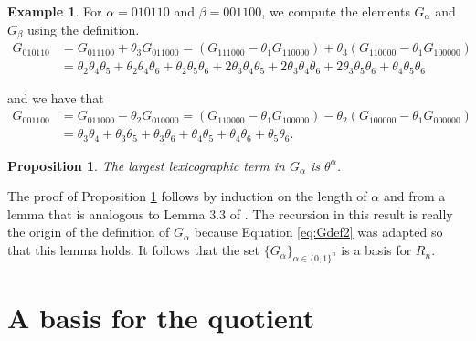 \documentclass[submission]{FPSAC2023}
\newtheorem{prop}[theorem]{Proposition}
\theoremstyle{definition}
\newtheorem{example}[theorem]{Example}
\numberwithin{equation}{section}
\begin{document}
\begin{example} For $\alpha = 010110$ and $\beta = 001100$, we compute
the elements $G_\alpha$ and $G_\beta$ using the definition.
\begin{align*}
G_{010110} &= G_{011100} + \theta_3 G_{011000} = (G_{111000} - \theta_1 G_{110000})
+ \theta_3(G_{110000} - \theta_1 G_{100000})\\
&= \theta_2 \theta_4 \theta_5 + \theta_2 \theta_4 \theta_6 + \theta_2 \theta_5 \theta_6
+ 2 \theta_3 \theta_4 \theta_5 + 2 \theta_3 \theta_4 \theta_6 + 2 \theta_3 \theta_5 \theta_6
+ \theta_4 \theta_5 \theta_6
\end{align*}

and we have that
\begin{align*}
G_{001100} &= G_{011000} - \theta_2 G_{010000} = (G_{110000} - \theta_1 G_{100000})
- \theta_2 (G_{100000} - \theta_1 G_{000000})\\
&= \theta_3 \theta_4 + \theta_3 \theta_5 + \theta_3 \theta_6 + \theta_4 \theta_5 + \theta_4 \theta_6 + \theta_5 \theta_6.
\end{align*}
\end{example}

\begin{prop}\label{prop:largest}
The largest lexicographic term in $G_\alpha$ is $\theta^\alpha$.
\end{prop}

The proof of Proposition \ref{prop:largest} follows by induction
on the length of $\alpha$ and
from a lemma that is analogous to Lemma 3.3 of \cite{AB}.
The recursion in this result is really the origin of the definition
of $G_\alpha$ because Equation \eqref{eq:Gdef2}
was adapted so that this lemma holds.  It follows that
the set $\{ G_\alpha \}_{\alpha \in \{0,1\}^n}$ is a basis
for $R_n$.


\section{A basis for the quotient}\label{sec:ballotbasis}
\end{document}
